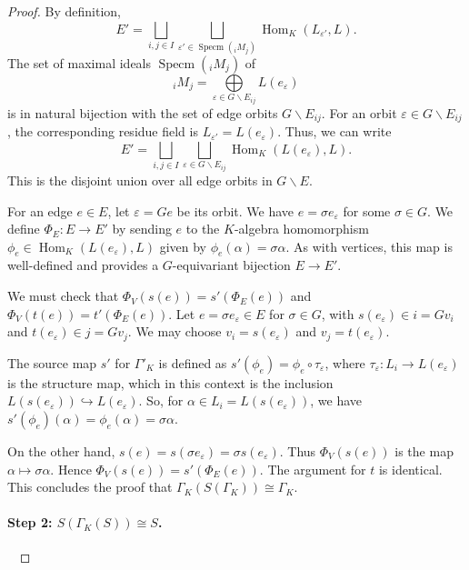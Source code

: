 \documentclass[10pt,a4paper]{amsart}
\DeclareMathOperator{\Hom}{\mathrm{Hom}}
\DeclareMathOperator{\Specm}{\mathrm{Specm}}
\begin{document}
\begin{proof}
    \smallskip
     By definition,
    \[
    E' = \bigsqcup\limits_{i,j\in I}\bigsqcup\limits_{\varepsilon'\in\Specm({}_iM_j)}\Hom_{K}(L_{\varepsilon'},L).
    \]
    The set of maximal ideals $\Specm({}_iM_j)$ of
    \[
      {}_iM_j = \bigoplus\limits_{\varepsilon \in G\backslash E_{ij}} L(e_\varepsilon)
    \]
    is in natural bijection with the set of edge orbits $G\backslash E_{ij}$. For an orbit $\varepsilon \in G\backslash E_{ij}$, the corresponding residue field is $L_{\varepsilon'} = L(e_\varepsilon)$. Thus, we can write
    \[
    E' = \bigsqcup\limits_{i,j\in I}\bigsqcup_{\varepsilon \in G\backslash E_{ij}} \Hom_{K}(L(e_\varepsilon),L).
    \]
    This is the disjoint union over all edge orbits in $G\backslash E$.

    For an edge $e\in E$, let $\varepsilon=Ge$ be its orbit. We have $e=\sigma e_\varepsilon$ for some $\sigma\in G$. We define $\Phi_E\colon E \to E'$ by sending $e$ to the $K$-algebra homomorphism $\phi_e \in \Hom_{K}(L(e_\varepsilon),L)$ given by $\phi_e(\alpha)=\sigma \alpha$. As with vertices, this map is well-defined and provides a $G$-equivariant bijection $E \to E'$.

    \smallskip
     We must check that $\Phi_V(s(e)) = s'(\Phi_E(e))$ and $\Phi_V(t(e)) = t'(\Phi_E(e))$. Let $e=\sigma e_\varepsilon \in E$ for $\sigma\in G$, with $s(e_\varepsilon)\in i=Gv_i$ and $t(e_\varepsilon)\in j=Gv_j$. We may choose $v_i=s(e_\varepsilon)$ and $v_j=t(e_\varepsilon)$.
    
    The source map $s'$ for $\Gamma'_K$ is defined as $s'(\phi_e) = \phi_e \circ \tau_\varepsilon$, where $\tau_\varepsilon\colon L_i \to L(e_\varepsilon)$ is the structure map, which in this context is the inclusion $L(s(e_\varepsilon))\hookrightarrow L(e_\varepsilon)$.
So, for $\alpha\in L_i = L(s(e_\varepsilon))$, we have $s'(\phi_e)(\alpha) = \phi_e(\alpha) = \sigma \alpha$.

    On the other hand, $s(e) = s(\sigma e_\varepsilon)=\sigma s(e_\varepsilon)$. Thus $\Phi_V(s(e))$ is the map $\alpha \mapsto \sigma \alpha$. Hence $\Phi_V(s(e)) = s'(\Phi_E(e))$. The argument for $t$ is identical. This concludes the proof that $\Gamma_K(S(\Gamma_K))\cong \Gamma_K$.

    \paragraph{Step 2: $S(\Gamma_K(S)) \cong S$.}\ 


\end{proof}
\end{document}
